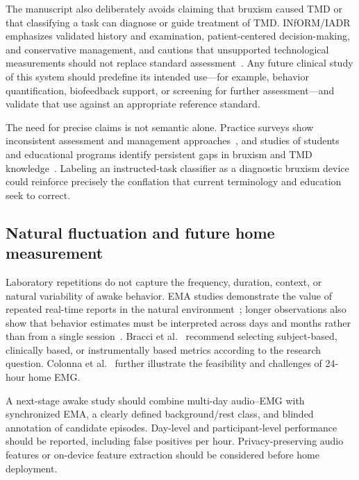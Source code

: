 \documentclass[pdflatex,sn-nature,iicol]{sn-jnl}
\begin{document}
\color{blue}
The manuscript also deliberately avoids claiming that bruxism caused TMD or that classifying a task can diagnose or guide treatment of TMD. INfORM/IADR emphasizes validated history and examination, patient-centered decision-making, and conservative management, and cautions that unsupported technological measurements should not replace standard assessment~\cite{inform2025tmd}. Any future clinical study of this system should predefine its intended use---for example, behavior quantification, biofeedback support, or screening for further assessment---and validate that use against an appropriate reference standard.
\color{black}

\color{blue}
The need for precise claims is not semantic alone. Practice surveys show inconsistent assessment and management approaches~\cite{mungia2025approaches}, and studies of students and educational programs identify persistent gaps in bruxism and TMD knowledge~\cite{nasanen2026competence,sangalli2026education}. Labeling an instructed-task classifier as a diagnostic bruxism device could reinforce precisely the conflation that current terminology and education seek to correct.
\color{black}

\color{blue}
\subsection{Natural fluctuation and future home measurement}
\color{black}

\color{blue}
Laboratory repetitions do not capture the frequency, duration, context, or natural variability of awake behavior. EMA studies demonstrate the value of repeated real-time reports in the natural environment~\cite{bracci2018frequency}; longer observations also show that behavior estimates must be interpreted across days and months rather than from a single session~\cite{colonna2025fluctuation}. Bracci et al.~\cite{bracci2024metrics} recommend selecting subject-based, clinically based, or instrumentally based metrics according to the research question. Colonna et al.~\cite{colonna2023electromyographic} further illustrate the feasibility and challenges of 24-hour home EMG.
\color{black}

\color{blue}
A next-stage awake study should combine multi-day audio--EMG with synchronized EMA, a clearly defined background/rest class, and blinded annotation of candidate episodes. Day-level and participant-level performance should be reported, including false positives per hour. Privacy-preserving audio features or on-device feature extraction should be considered before home deployment.
\color{black}
\end{document}
